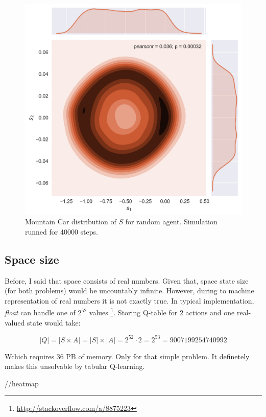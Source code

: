 \documentclass[12pt]{article}
\begin{document}
\begin{figure}[h]
\includegraphics[width=\textwidth]{exploratory_mountaincar.png} 
\centering
\caption{Mountain Car distribution of $S$ for random agent. Simulation runned for 40000 steps.}
\end{figure}

\subsection{Space size}

Before, I said that space consists of real numbers. Given that, space state size (for both problems) would be uncountably infinite. However, during to machine representation of real numbers it is not exactly true. In typical implementation, \emph{float} can handle one of $2^{52}$ values \footnote{\url{http://stackoverflow.com/a/8875223}}. Storing Q-table for 2 actions and one real-valued state would take:



\begin{equation}
|Q| = |S \times A| = |S| \times |A| = 2^{52} \cdot 2 = 2^{53} = 9007199254740992
\end{equation}

Wchich requires 36 PB of memory. Only for that simple problem. It definetely makes this unsolvable by tabular Q-learning.

//heatmap
\end{document}
